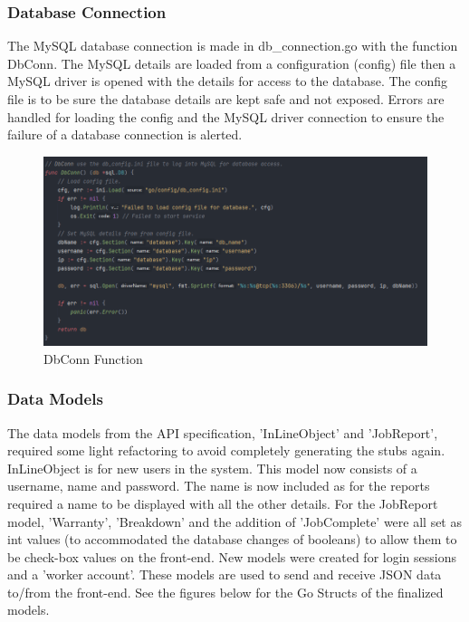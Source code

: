 \subsubsection{Database Connection}
The MySQL database connection is made in db\_connection.go with the function DbConn. The MySQL details are loaded from a configuration (config) file then a MySQL driver is opened with the details for access to the database. The config file is to be sure the database details are kept safe and not exposed. Errors are handled for loading the config and the MySQL driver connection to ensure the failure of a database connection is alerted. 

\begin{figure}[H]
    \caption{DbConn Function}
    \label{image:DbConn}
    \centering
    \includegraphics[width=1.0\textwidth]{images/horton/db_conn.png}
\end{figure}
 \newpage
\subsubsection{Data Models}
The data models from the API specification, 'InLineObject' and 'JobReport', required some light refactoring to avoid completely generating the stubs again. InLineObject is for new users in the system. This model now consists of a username, name and password. The name is now included as for the reports required a name to be displayed with all the other details. For the JobReport model, 'Warranty', 'Breakdown' and the addition of 'JobComplete' were all set as int values (to accommodated the database changes of booleans) to allow them to be check-box values on the front-end. New models were created for login sessions and a 'worker account'. These models are used to send and receive JSON data to/from the front-end. See the figures below for the Go Structs of the finalized models. 

